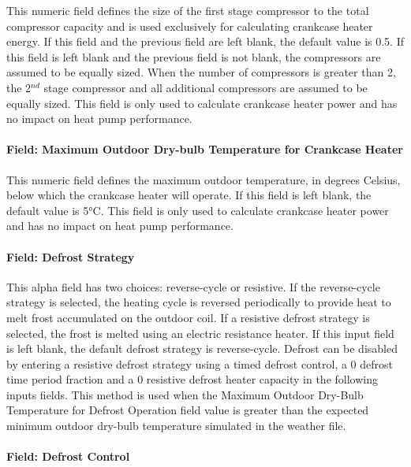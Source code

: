 This numeric field defines the size of the first stage compressor to the total compressor capacity and is used exclusively for calculating crankcase heater energy. If this field and the previous field are left blank, the default value is 0.5. If this field is left blank and the previous field is not blank, the compressors are assumed to be equally sized. When the number of compressors is greater than 2, the 2\(^{nd}\) stage compressor and all additional compressors are assumed to be equally sized. This field is only used to calculate crankcase heater power and has no impact on heat pump performance.

\paragraph{Field: Maximum Outdoor Dry-bulb Temperature for Crankcase Heater}\label{field-maximum-outdoor-dry-bulb-temperature-for-crankcase-heater-1}

This numeric field defines the maximum outdoor temperature, in degrees Celsius, below which the crankcase heater will operate. If this field is left blank, the default value is 5°C. This field is only used to calculate crankcase heater power and has no impact on heat pump performance.

\paragraph{Field: Defrost Strategy}\label{field-defrost-strategy-1-000}

This alpha field has two choices: reverse-cycle or resistive. If the reverse-cycle strategy is selected, the heating cycle is reversed periodically to provide heat to melt frost accumulated on the outdoor coil. If a resistive defrost strategy is selected, the frost is melted using an electric resistance heater. If this input field is left blank, the default defrost strategy is reverse-cycle. Defrost can be disabled by entering a resistive defrost strategy using a timed defrost control, a 0 defrost time period fraction and a 0 resistive defrost heater capacity in the following inputs fields. This method is used when the Maximum Outdoor Dry-Bulb Temperature for Defrost Operation field value is greater than the expected minimum outdoor dry-bulb temperature simulated in the weather file.

\paragraph{Field: Defrost Control}\label{field-defrost-control-1-000}

